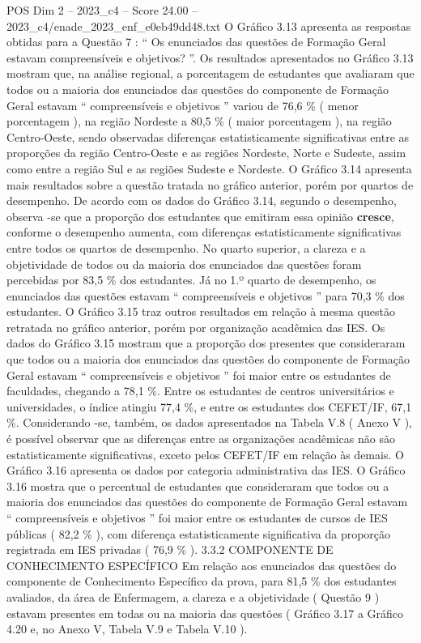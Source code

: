 \begin{textsample}{POS Dim 2 – 2023\_c4 – Score 24.00 – 2023\_c4/enade\_2023\_enf\_e0eb49dd48.txt}
O Gráfico 3.13 apresenta as respostas obtidas para a Questão 7 : “ Os enunciados das questões de Formação Geral estavam compreensíveis e objetivos? ”.
Os resultados apresentados no Gráfico 3.13 mostram que, na análise regional, a porcentagem de estudantes que avaliaram que todos ou a maioria dos enunciados das questões do componente de Formação Geral estavam “ compreensíveis e objetivos ” variou de 76,6 \% ( menor porcentagem ), na região Nordeste a 80,5 \% ( maior porcentagem ), na região Centro-Oeste, sendo observadas diferenças estatisticamente significativas entre as proporções da região Centro-Oeste e as regiões Nordeste, Norte e Sudeste, assim como entre a região Sul e as regiões Sudeste e Nordeste.
O Gráfico 3.14 apresenta mais resultados sobre a questão tratada no gráfico anterior, porém por quartos de desempenho.
De acordo com os dados do Gráfico 3.14, segundo o desempenho, observa -se que a proporção dos estudantes que emitiram essa opinião \textbf{cresce}, conforme o desempenho aumenta, com diferenças estatisticamente significativas entre todos os quartos de desempenho.
No quarto superior, a clareza e a objetividade de todos ou da maioria dos enunciados das questões foram percebidas por 83,5 \% dos estudantes.
Já no 1.º quarto de desempenho, os enunciados das questões estavam “ compreensíveis e objetivos ” para 70,3 \% dos estudantes.
O Gráfico 3.15 traz outros resultados em relação à mesma questão retratada no gráfico anterior, porém por organização acadêmica das IES.
Os dados do Gráfico 3.15 mostram que a proporção dos presentes que consideraram que todos ou a maioria dos enunciados das questões do componente de Formação Geral estavam “ compreensíveis e objetivos ” foi maior entre os estudantes de faculdades, chegando a 78,1 \%.
Entre os estudantes de centros universitários e universidades, o índice atingiu 77,4 \%, e entre os estudantes dos CEFET/IF, 67,1 \%.
Considerando -se, também, os dados apresentados na Tabela V.8 ( Anexo V ), é possível observar que as diferenças entre as organizações acadêmicas não são estatisticamente significativas, exceto pelos CEFET/IF em relação às demais.
O Gráfico 3.16 apresenta os dados por categoria administrativa das IES.
O Gráfico 3.16 mostra que o percentual de estudantes que consideraram que todos ou a maioria dos enunciados das questões do componente de Formação Geral estavam “ compreensíveis e objetivos ” foi maior entre os estudantes de cursos de IES públicas ( 82,2 \% ), com diferença estatisticamente significativa da proporção registrada em IES privadas ( 76,9 \% ). 3.3.2 COMPONENTE DE CONHECIMENTO ESPECÍFICO Em relação aos enunciados das questões do componente de Conhecimento Específico da prova, para 81,5 \% dos estudantes avaliados, da área de Enfermagem, a clareza e a objetividade ( Questão 9 ) estavam presentes em todas ou na maioria das questões ( Gráfico 3.17 a Gráfico 4.20 e, no Anexo V, Tabela V.9 e Tabela V.10 ).

\end{textsample}
